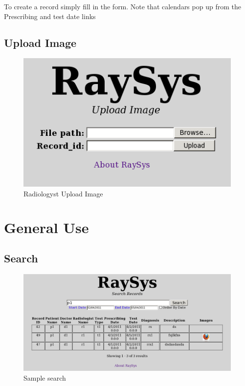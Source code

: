 \documentclass[11pt]{report}
\begin{document}
To create a record simply fill in the form. Note that calendars pop up from the Prescribing and test date links

\section*{Upload Image}
\begin{figure}[htb]
  \begin{center}
    \includegraphics[scale=0.60]{imgs/rad2.png}
    \caption{Radiologyst Upload Image}
    \label{fig:rad2}
  \end{center}
\end{figure}

\chapter*{General Use}
\section*{Search}

\begin{figure}[htb]
  \begin{center}
    \includegraphics[scale=0.50]{imgs/search1.png}
    \caption{Sample search}
    \label{fig:gen1}
      \end{center}
\end{figure}
\end{document}
